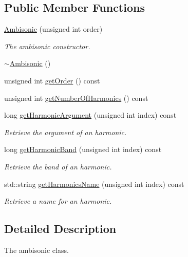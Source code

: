 \subsection*{Public Member Functions}
\begin{DoxyCompactItemize}
\item 
\hyperlink{class_hoa2_d_1_1_ambisonic_ac53cc3ea0b6600dd84d761f89b5af9d3}{Ambisonic} (unsigned int order)
\begin{DoxyCompactList}\small\item\em The ambisonic constructor. \end{DoxyCompactList}\item 
\hyperlink{class_hoa2_d_1_1_ambisonic_a27be996cfb2bad88e13a32c0d7dba517}{$\sim$\-Ambisonic} ()
\item 
unsigned int \hyperlink{class_hoa2_d_1_1_ambisonic_a00797f96b864e2913567e08239ed9593}{get\-Order} () const 
\item 
unsigned int \hyperlink{class_hoa2_d_1_1_ambisonic_ae7cee18218c9bf00091d83e661d487ee}{get\-Number\-Of\-Harmonics} () const 
\item 
long \hyperlink{class_hoa2_d_1_1_ambisonic_a68c389087fb999101a499f6849b635f9}{get\-Harmonic\-Argument} (unsigned int index) const 
\begin{DoxyCompactList}\small\item\em Retrieve the argument of an harmonic. \end{DoxyCompactList}\item 
long \hyperlink{class_hoa2_d_1_1_ambisonic_a9485abf2b4f1b1aec8d0da9b12cf42ed}{get\-Harmonic\-Band} (unsigned int index) const 
\begin{DoxyCompactList}\small\item\em Retrieve the band of an harmonic. \end{DoxyCompactList}\item 
std\-::string \hyperlink{class_hoa2_d_1_1_ambisonic_a6b6f6ff74792f00bf5095dc9cfec28a4}{get\-Harmonics\-Name} (unsigned int index) const 
\begin{DoxyCompactList}\small\item\em Retrieve a name for an harmonic. \end{DoxyCompactList}\end{DoxyCompactItemize}


\subsection{Detailed Description}
The ambisonic class. 

